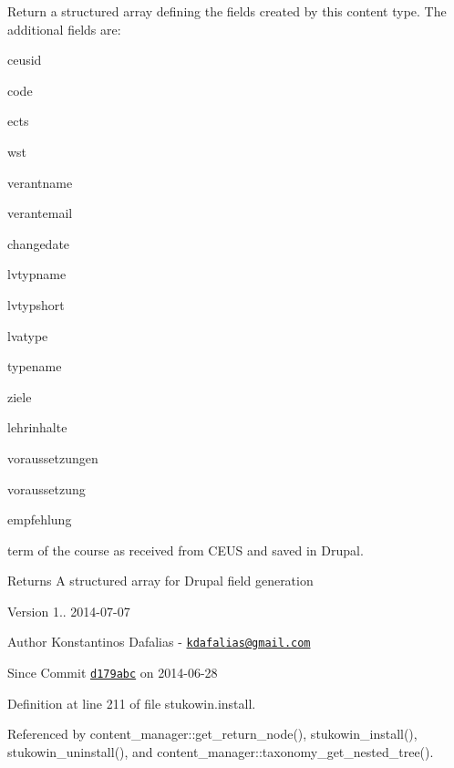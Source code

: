 Return a structured array defining the fields created by this content type. The additional fields are\+:
\begin{DoxyItemize}
\item ceusid
\item code
\item ects
\item wst
\item verantname
\item verantemail
\item changedate
\item lvtypname
\item lvtypshort
\item lvatype
\item typename
\item ziele
\item lehrinhalte
\item voraussetzungen
\item voraussetzung
\item empfehlung
\item term of the course as received from C\+E\+U\+S and saved in Drupal. \begin{DoxyReturn}{Returns}
A structured array for Drupal field generation
\end{DoxyReturn}
\begin{DoxyVersion}{Version}
1.. 2014-\/07-\/07 
\end{DoxyVersion}
\begin{DoxyAuthor}{Author}
Konstantinos Dafalias -\/ \href{mailto:kdafalias@gmail.com}{\tt kdafalias@gmail.\+com} 
\end{DoxyAuthor}
\begin{DoxySince}{Since}
Commit \href{http://github.com/TheJake123/DrupalModul/commit/d179abcc5e05743086cd67cf1ce30b08923a7183}{\tt d179abc} on 2014-\/06-\/28 
\end{DoxySince}

\end{DoxyItemize}

Definition at line 211 of file stukowin.\+install.



Referenced by content\+\_\+manager\+::get\+\_\+return\+\_\+node(), stukowin\+\_\+install(), stukowin\+\_\+uninstall(), and content\+\_\+manager\+::taxonomy\+\_\+get\+\_\+nested\+\_\+tree().



